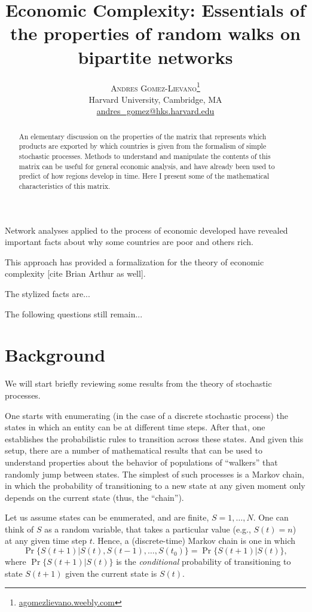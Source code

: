 \documentclass[letterpaper, 14pt]{extarticle}
\title{\vspace{-15mm}%
	\fontsize{24pt}{10pt}\selectfont
	\textbf{Economic Complexity: Essentials of the properties of random walks on bipartite networks}
	}
\author{%
	\large
	\textsc{Andres Gomez-Lievano}\thanks{\href{http://agomezlievano.weebly.com}{agomezlievano.weebly.com}} \\[2mm]
	\normalsize	Harvard University, Cambridge, MA \\
	\normalsize	\href{mailto:andres\_gomez@hks.harvard.edu}{andres\_gomez@hks.harvard.edu}
	\vspace{-5mm}
	}
\date{}
\begin{document}
\maketitle
\thispagestyle{fancy}

\begin{abstract}
\noindent An elementary discussion on the properties of the matrix that represents which products are exported by which countries is given from the formalism of simple stochastic processes. Methods to understand and manipulate the contents of this matrix can be useful for general economic analysis, and have already been used to predict of how regions develop in time. Here I present some of the mathematical characteristics of this matrix. 
\end{abstract}
	
Network analyses applied to the process of economic developed have revealed important facts about why some countries are poor and others rich. 

This approach has provided a formalization for the theory of economic complexity [cite Brian Arthur as well].

The stylized facts are...

The following questions still remain...

\section{Background}
We will start briefly reviewing some results from the theory of stochastic processes. 

One starts with enumerating (in the case of a discrete stochastic process) the states in which an entity can be at different time steps. After that, one establishes the probabilistic rules to transition across these states. And given this setup, there are a number of mathematical results that can be used to understand properties about the behavior of populations of ``walkers'' that randomly jump between states. The simplest of such processes is a Markov chain, in which the probability of transitioning to a new state at any given moment only depends on the current state (thus, the ``chain''). 

Let us assume states can be enumerated, and are finite, $S=1,\ldots,N$. One can think of $S$ as a random variable, that takes a particular value (e.g., $S(t)=n$) at any given time step $t$. Hence, a (discrete-time) Markov chain is one in which
$$
	\Pr\{S(t+1)|S(t),S(t-1),\ldots,S(t_0)\}=\Pr\{S(t+1)|S(t)\},
$$
where $\Pr\{S(t+1)|S(t)\}$ is the \emph{conditional} probability of transitioning to state $S(t+1)$ given the current state is $S(t)$.
\end{document}
